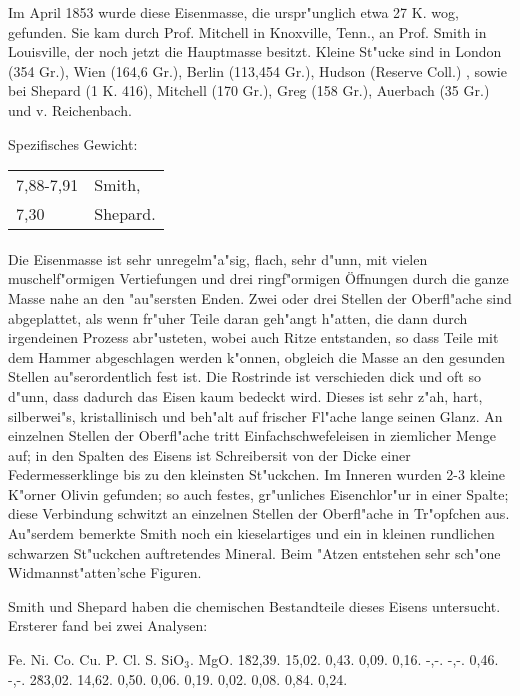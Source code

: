 \documentclass[a4paper, 11pt, oneside]{article}
\begin{document}
Im April 1853 wurde diese Eisenmasse, die urspr"unglich etwa 27 K. wog, gefunden. Sie kam durch Prof. Mitchell in Knoxville, Tenn., an Prof. Smith in Louisville, der noch jetzt die Hauptmasse besitzt. Kleine St"ucke sind in London (354 Gr.), Wien (164,6 Gr.), Berlin (113,454 Gr.), Hudson (Reserve Coll.) , sowie bei Shepard (1 K. 416), Mitchell (170 Gr.), Greg (158 Gr.), Auerbach (35 Gr.) und v. Reichenbach.

Spezifisches Gewicht:  
\begin{table}[!ht]
    \centering
    \begin{tabular}{l l}
        7,88-7,91 & Smith,\\
        7,30 & Shepard.
    \end{tabular}
\end{table}
\paragraph{}
Die Eisenmasse ist sehr unregelm"a"sig, flach, sehr d"unn, mit vielen muschelf"ormigen Vertiefungen und drei ringf"ormigen Öffnungen durch die ganze Masse nahe an den "au"sersten Enden. Zwei oder drei Stellen der Oberfl"ache sind abgeplattet, als wenn fr"uher Teile daran geh"angt h"atten, die dann durch irgendeinen Prozess abr"usteten, wobei auch Ritze entstanden, so dass Teile mit dem Hammer abgeschlagen werden k"onnen, obgleich die Masse an den gesunden Stellen au"serordentlich fest ist. Die Rostrinde ist verschieden dick und oft so d"unn, dass dadurch das Eisen kaum bedeckt wird. Dieses ist sehr z"ah, hart, silberwei"s, kristallinisch und beh"alt auf frischer Fl"ache lange seinen Glanz. An einzelnen Stellen der Oberfl"ache tritt Einfachschwefeleisen in ziemlicher Menge auf; in den Spalten des Eisens ist Schreibersit von der Dicke einer Federmesserklinge bis zu den kleinsten St"uckchen. Im Inneren wurden 2-3 kleine K"orner Olivin gefunden; so auch festes, gr"unliches Eisenchlor"ur in einer Spalte; diese Verbindung schwitzt an einzelnen Stellen der Oberfl"ache in Tr"opfchen aus. Au"serdem bemerkte Smith noch ein kieselartiges und ein in kleinen rundlichen schwarzen St"uckchen auftretendes Mineral. Beim "Atzen entstehen sehr sch"one Widmannst"atten'sche Figuren.

Smith und Shepard haben die chemischen Bestandteile dieses Eisens untersucht. Ersterer fand bei zwei Analysen:

Fe. Ni. Co. Cu. P. Cl. S. SiO$_{3}$. MgO.  
1\. 82,39. 15,02. 0,43. 0,09. 0,16. -,-. -,-. 0,46. -,-.  
2\. 83,02. 14,62. 0,50. 0,06. 0,19. 0,02. 0,08. 0,84. 0,24.
\end{document}
